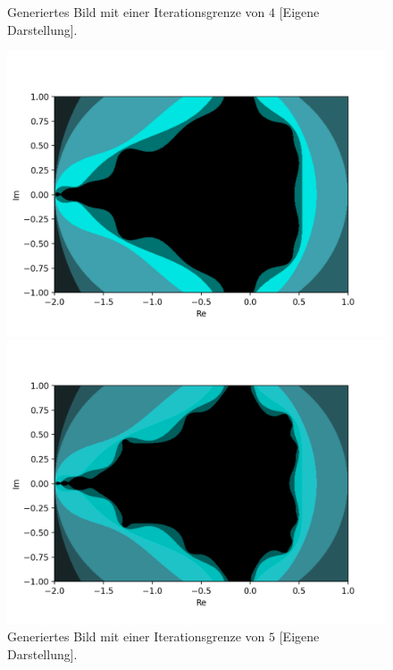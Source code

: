 \begin{figure}[H]
\begin{minipage}[t]{0.48\textwidth}
  \caption{Generiertes Bild mit einer Iterationsgrenze von $4$ [Eigene Darstellung].}
  \label{app:8.4}
\end{minipage}
\begin{minipage}[t]{0.48\textwidth}
  \centering
  \includegraphics[width=\linewidth]{images/maxBorder/5}
  \vspace*{-8ex}
  \caption{Generiertes Bild mit einer Iterationsgrenze von $5$ [Eigene Darstellung].}
  \label{app:8.5}
\end{minipage}%
\hspace{2ex}
\begin{minipage}[t]{0.48\textwidth}
  \centering
  \includegraphics[width=\linewidth]{images/maxBorder/6}

\end{minipage}
\end{figure}
